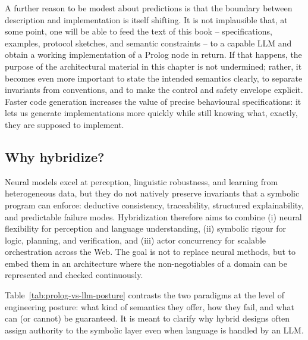 A further reason to be modest about predictions is that the boundary between description and implementation is itself shifting. It is not implausible that, at some point, one will be able to feed the text of this book -- specifications, examples, protocol sketches, and semantic constraints -- to a capable LLM and obtain a working implementation of a Prolog node in return. If that happens, the purpose of the architectural material in this chapter is not undermined; rather, it becomes even more important to state the intended semantics clearly, to separate invariants from conventions, and to make the control and safety envelope explicit. Faster code generation increases the value of precise behavioural specifications: it lets us generate implementations more quickly while still knowing what, exactly, they are supposed to implement.

\subsection{Why hybridize?}
\label{sec:why-hybridize}

Neural models excel at perception, linguistic robustness, and learning from heterogeneous data, but they do not natively preserve invariants that a symbolic program can enforce: deductive consistency, traceability, structured explainability, and predictable failure modes. Hybridization therefore aims to combine (i) neural flexibility for perception and language understanding, (ii) symbolic rigour for logic, planning, and verification, and (iii) actor concurrency for scalable orchestration across the Web. The goal is not to replace neural methods, but to embed them in an architecture where the non-negotiables of a domain can be represented and checked continuously.

Table~\ref{tab:prolog-vs-llm-posture} contrasts the two paradigms at the level of engineering posture: what kind of semantics they offer, how they fail, and what can (or cannot) be guaranteed. It is meant to clarify why hybrid designs often assign authority to the symbolic layer even when language is handled by an LLM.

